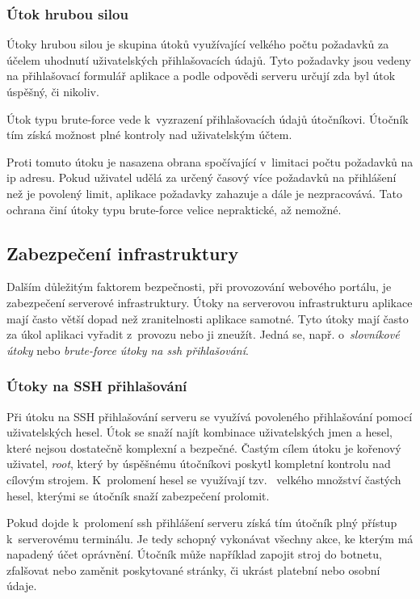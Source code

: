 \subsubsection{Útok hrubou silou}

Útoky hrubou silou\cite{bruteforce} je skupina útoků využívající velkého počtu požadavků za účelem uhodnutí uživatelských přihlašovacích údajů. Tyto požadavky jsou vedeny na přihlašovací formulář aplikace a podle odpovědi serveru určují zda byl útok úspěšný, či nikoliv.

Útok typu brute-force vede k~vyzrazení přihlašovacích údajů útočníkovi. Útočník tím získá možnost plné kontroly nad uživatelským účtem.

Proti tomuto útoku je nasazena obrana spočívající v~limitaci počtu požadavků na \acrshort{ip} adresu. Pokud uživatel udělá za určený časový více požadavků na přihlášení než je povolený limit, aplikace požadavky zahazuje a dále je nezpracovává. Tato ochrana činí útoky typu brute-force velice nepraktické, až nemožné.

\subsection{Zabezpečení infrastruktury}

Dalším důležitým faktorem bezpečnosti, při provozování webového portálu, je zabezpečení serverové infrastruktury.
Útoky na serverovou infrastrukturu aplikace mají často větší dopad než zranitelnosti aplikace samotné.
Tyto útoky mají často za úkol aplikaci vyřadit z~provozu nebo ji zneužít.
Jedná se, např. o~\emph{slovníkové útoky} nebo \emph{brute-force útoky na \acrshort{ssh} přihlašování}.

\subsubsection{Útoky na SSH přihlašování}

Při útoku na SSH přihlašování serveru se využívá povoleného přihlašování pomocí uživatelských hesel.
Útok se snaží najít kombinace uživatelských jmen a hesel, které nejsou dostatečně komplexní a bezpečné.
Častým cílem útoku je kořenový uživatel, \emph{root}, který by úspěšnému útočníkovi poskytl kompletní kontrolu nad cílovým strojem.
K~prolomení hesel se využívají tzv.\  velkého množství častých hesel, kterými se útočník snaží zabezpečení prolomit.

Pokud dojde k~prolomení \acrshort{ssh} přihlášení serveru získá tím útočník plný přístup k~serverovému terminálu. Je tedy schopný vykonávat všechny akce, ke kterým má napadený účet oprávnění. Útočník může například zapojit stroj do botnetu\cite{botnet}, zfalšovat nebo zaměnit poskytované stránky, či ukrást platební nebo osobní údaje.

